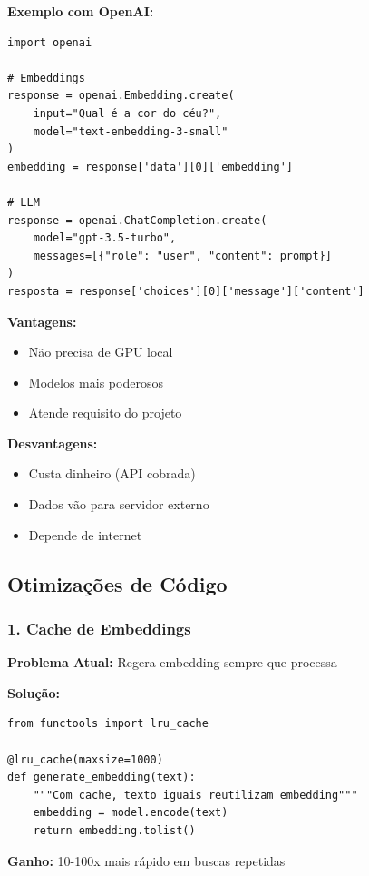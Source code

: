 \documentclass[12pt,a4paper]{article}
\begin{document}
\textbf{Exemplo com OpenAI:}

\begin{lstlisting}
import openai

# Embeddings
response = openai.Embedding.create(
    input="Qual é a cor do céu?",
    model="text-embedding-3-small"
)
embedding = response['data'][0]['embedding']

# LLM
response = openai.ChatCompletion.create(
    model="gpt-3.5-turbo",
    messages=[{"role": "user", "content": prompt}]
)
resposta = response['choices'][0]['message']['content']
\end{lstlisting}

\textbf{Vantagens:}
\begin{itemize}
    \item Não precisa de GPU local
    \item Modelos mais poderosos
    \item Atende requisito do projeto
\end{itemize}

\textbf{Desvantagens:}
\begin{itemize}
    \item Custa dinheiro (API cobrada)
    \item Dados vão para servidor externo
    \item Depende de internet
\end{itemize}

\subsection{Otimizações de Código}

\subsubsection{1. Cache de Embeddings}

\textbf{Problema Atual:} Regera embedding sempre que processa

\textbf{Solução:}

\begin{lstlisting}
from functools import lru_cache

@lru_cache(maxsize=1000)
def generate_embedding(text):
    """Com cache, texto iguais reutilizam embedding"""
    embedding = model.encode(text)
    return embedding.tolist()
\end{lstlisting}

\textbf{Ganho:} 10-100x mais rápido em buscas repetidas
\end{document}
